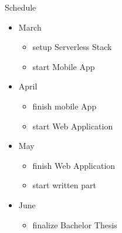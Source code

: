 \documentclass[aspectratio=1610]{beamer}
\begin{document}
  \begin{frame}{Schedule}
    \begin{itemize}
      \item March
        \begin{itemize}
          \item setup Serverless Stack
          \item start Mobile App
        \end{itemize}
      \item April
        \begin{itemize}
          \item finish mobile App
          \item start Web Application
        \end{itemize}
      \item May
        \begin{itemize}
          \item finish Web Application
          \item start written part
        \end{itemize}
      \item June
        \begin{itemize}
          \item finalize Bachelor Thesis
        \end{itemize}
    \end{itemize}
  \end{frame}
\end{document}
